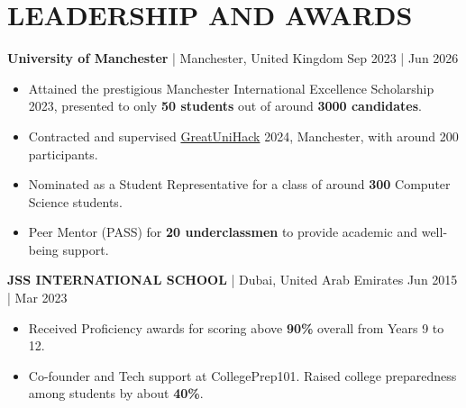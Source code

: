 \documentclass[a4paper]{extarticle}
\begin{document}

\section*{LEADERSHIP AND AWARDS}
\noindent
\textbf{University of Manchester} | Manchester, United Kingdom \hfill
Sep 2023 | Jun 2026 %
\begin{itemize}
  \item Attained the prestigious Manchester International Excellence
    Scholarship 2023, presented to only \textbf{50 students} out of
    around \textbf{3000 candidates}.
  \item Contracted and supervised
    \href{https://www.greatunihack.com}{GreatUniHack} 2024,
    Manchester, with around 200 participants.
  \item Nominated as a Student Representative for a class of around
    \textbf{300} Computer Science students.
  \item Peer Mentor (PASS) for \textbf{20 underclassmen} to provide
    academic and well-being support.
\end{itemize}

\noindent
\textbf{JSS INTERNATIONAL SCHOOL} | Dubai, United Arab Emirates
\hfill Jun 2015 | Mar 2023
\begin{itemize}
  \item Received Proficiency awards for scoring above \textbf{90\%}
    overall from Years 9 to 12.
  \item Co-founder and Tech support at CollegePrep101. Raised college
    preparedness among students by about \textbf{40\%}.
\end{itemize}
\end{document}
